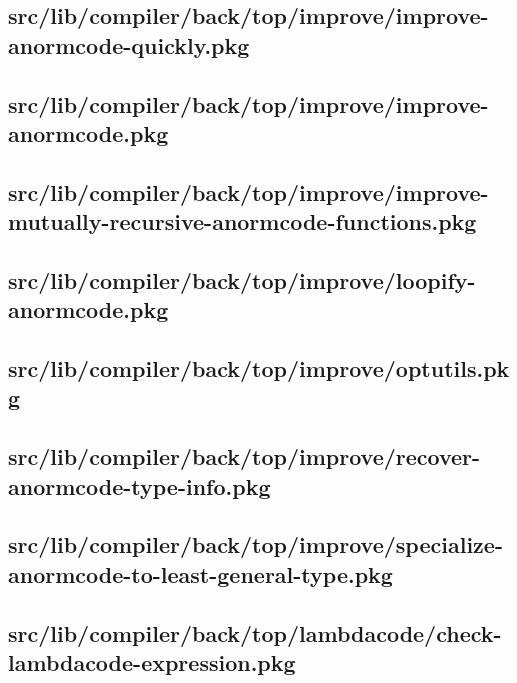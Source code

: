 \subsection{src/lib/compiler/back/top/improve/improve-anormcode-quickly.pkg}


\subsection{src/lib/compiler/back/top/improve/improve-anormcode.pkg}


\subsection{src/lib/compiler/back/top/improve/improve-mutually-recursive-anormcode-functions.pkg}


\subsection{src/lib/compiler/back/top/improve/loopify-anormcode.pkg}


\subsection{src/lib/compiler/back/top/improve/optutils.pkg}


\subsection{src/lib/compiler/back/top/improve/recover-anormcode-type-info.pkg}


\subsection{src/lib/compiler/back/top/improve/specialize-anormcode-to-least-general-type.pkg}


\subsection{src/lib/compiler/back/top/lambdacode/check-lambdacode-expression.pkg}


